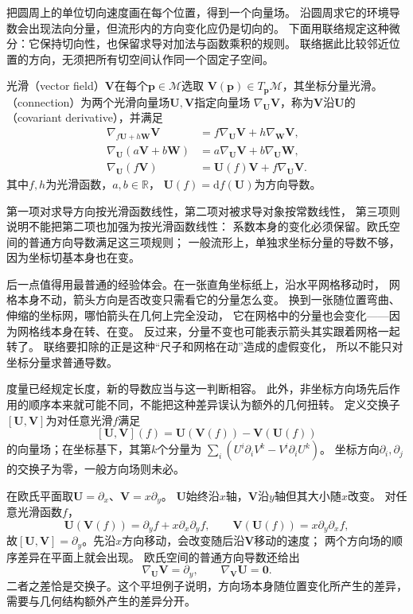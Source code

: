 把圆周上的单位切向速度画在每个位置，得到一个向量场。
沿圆周求它的环境导数会出现法向分量，但流形内的方向变化应仍是切向的。
下面用联络规定这种微分：它保持切向性，也保留求导对加法与函数乘积的规则。
联络据此比较邻近位置的方向，无须把所有切空间认作同一个固定子空间。

\begin{definition}[向量场与联络]
\label{def:geometry-connection}
光滑（vector field）$\bm V$在每个$\bm p\in\mathcal M$选取
$\bm V(\bm p)\in T_{\bm p}\mathcal M$，其坐标分量光滑。
（connection）为两个光滑向量场$\bm U,\bm V$指定向量场
$\nabla_{\bm U}\bm V$，称为$\bm V$沿$\bm U$的
（covariant derivative），并满足
\[
 \begin{aligned}
 \nabla_{f\bm U+h\bm W}\bm V
   &=f\nabla_{\bm U}\bm V+h\nabla_{\bm W}\bm V,\\
 \nabla_{\bm U}(a\bm V+b\bm W)
   &=a\nabla_{\bm U}\bm V+b\nabla_{\bm U}\bm W,\\
 \nabla_{\bm U}(f\bm V)
   &=\bm U(f)\bm V+f\nabla_{\bm U}\bm V.
 \end{aligned}
\]
其中$f,h$为光滑函数，$a,b\in\mathbb R$，
$\bm U(f)=\mathrm df(\bm U)$为方向导数。
\end{definition}
第一项对求导方向按光滑函数线性，第二项对被求导对象按常数线性，
第三项则说明不能把第二项也加强为按光滑函数线性：
系数本身的变化必须保留。欧氏空间的普通方向导数满足这三项规则；
一般流形上，单独求坐标分量的导数不够，因为坐标切基本身也在变。

后一点值得用最普通的经验体会。在一张直角坐标纸上，沿水平网格移动时，
网格本身不动，箭头方向是否改变只需看它的分量怎么变。
换到一张随位置弯曲、伸缩的坐标网，哪怕箭头在几何上完全没动，
它在网格中的分量也会变化——因为网格线本身在转、在变。
反过来，分量不变也可能表示箭头其实跟着网格一起转了。
联络要扣除的正是这种“尺子和网格在动”造成的虚假变化，
所以不能只对坐标分量求普通导数。

度量已经规定长度，新的导数应当与这一判断相容。
此外，非坐标方向场先后作用的顺序本来就可能不同，不能把这种差异误认为额外的几何扭转。
定义交换子$[\bm U,\bm V]$为对任意光滑$f$满足
\[
 [\bm U,\bm V](f)=\bm U(\bm V(f))-\bm V(\bm U(f))
\]
的向量场；在坐标基下，其第$k$个分量为
$\sum_i(U^i\partial_iV^k-V^i\partial_iU^k)$。
坐标方向$\partial_i,\partial_j$的交换子为零，一般方向场则未必。

\begin{example}[平面上不可交换的方向场]
\label{ex:geometry-plane-field-commutator}
在欧氏平面取$\bm U=\partial_x$、$\bm V=x\partial_y$。
$\bm U$始终沿$x$轴，$\bm V$沿$y$轴但其大小随$x$改变。
对任意光滑函数$f$，
\[
 \bm U(\bm V(f))=\partial_yf+x\partial_x\partial_yf,\qquad
 \bm V(\bm U(f))=x\partial_y\partial_xf,
\]
故$[\bm U,\bm V]=\partial_y$。先沿$x$方向移动，会改变随后沿$\bm V$移动的速度；
两个方向场的顺序差异在平面上就会出现。
欧氏空间的普通方向导数还给出
\[
 \nabla_{\bm U}\bm V=\partial_y,\qquad
 \nabla_{\bm V}\bm U=\bm0.
\]
二者之差恰是交换子。这个平坦例子说明，方向场本身随位置变化所产生的差异，
需要与几何结构额外产生的差异分开。
\end{example}

